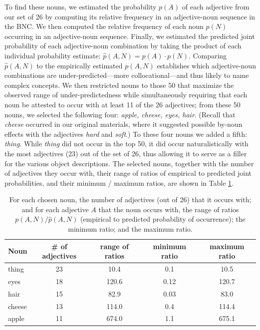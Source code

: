 \documentclass[12pt]{article}
\begin{document}
To find these nouns, we estimated the probability $p(A)$ of each adjective from our set of 26 by computing its relative frequency in an adjective-noun sequence in the BNC. We then computed the relative frequency of each noun $p(N)$ occurring in an adjective-noun sequence. Finally, we estimated the predicted joint probability of each adjective-noun combination by taking the product of each individual probability estimate: $\hat{p}(A,N) = p(A)\cdot p(N)$. Comparing  $\hat{p}(A,N)$ to the empirically estimated $p(A,N)$ establishes which adjective-noun combinations are under-predicted---more collocational---and thus likely to name complex concepts. We then restricted nouns to those 50 that maximize the observed range of under-predictedness while simultaneously requiring that each noun be attested to occur with at least 11 of the 26 adjectives; from these 50 nouns, we selected the following four: \emph{apple, cheese, eyes, hair}. (Recall that \emph{cheese} occurred in our original materials, where it suggested possible by-noun effects with the adjectives \emph{hard} and \emph{soft}.) To these four nouns we added a fifth: \emph{thing}.
While \emph{thing} did not occur in the top 50, it did occur naturalistically with the most adjectives (23) out of the set of 26, thus allowing it to serve as a filler for the various object descriptions. The selected nouns, together with the number of adjectives they occur with, their range of ratios of empirical to predicted joint probabilities, and their minimum / maximum ratios, are shown in Table \ref{tab:nouns}.

\begin{table}
\centering
\begin{tabular}{l c c c c}
\toprule
Noun & \# of adjectives & range of ratios & minimum ratio & maximum ratio\\
\midrule
thing & 23 & 10.4 & 0.1 & 10.5 \\
eyes & 18 & 120.6 & 0.12 & 120.7 \\
hair & 15 & 82.9 & 0.03 & 83.0 \\
cheese & 13 & 114.0 & 0.4 & 114.4 \\
apple & 11 & 674.0 & 1.1 & 675.1 \\
\bottomrule
\end{tabular}
\caption{For each chosen noun, the number of adjectives (out of 26) that it occurs with; and for each adjective $A$ that the noun occurs with, the range of ratios $p(A,N) / \hat{p}(A,N)$ (empirical to predicted probability of occurrence); the minimum ratio; and the maximum ratio.}
\label{tab:nouns}
\end{table}
\end{document}
